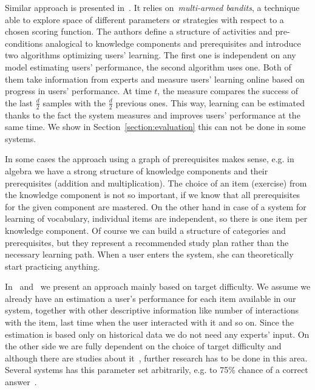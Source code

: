 \documentclass[table,color,cover,twoside,nolot,nolof]{fithesis3/fithesis3}
\begin{document}
Similar approach is presented in~\cite{lopes2015multi}. It relies
on~\emph{multi-armed bandits}, a technique able to explore
space of different parameters or strategies with respect to a chosen scoring
function. The authors define a structure of activities and pre-conditions
analogical to knowledge components and prerequisites and introduce two
algorithms optimizing users' learning. The first one is independent on any
model estimating users' performance, the second algorithm uses one. Both of
them take information from experts and measure users' learning online based on
progress in users' performance. At time $t$, the measure compares the success
of the last $\frac{d}{2}$ samples with the $\frac{d}{2}$ previous ones. This
way, learning can be estimated thanks to the fact the system measures and
improves users' performance at the same time. We show in
Section~\ref{section:evaluation} this can not be done in some systems.

In some cases the approach using a graph of prerequisites makes sense, e.g.
in algebra we have a strong structure of knowledge
components and their prerequisites (addition and multiplication). The choice
of an item (exercise) from the knowledge component is not so important, if we
know that all prerequisites for the given component are mastered. On the other
hand in case of a system for learning of vocabulary, individual items are
independent, so there is one item per knowledge component. Of course we can
build a structure of categories and prerequisites, but they represent a
recommended study plan rather than the necessary learning path. When a user
enters the system, she can theoretically start practicing anything.

In~\cite{papousek2014adaptive} and~\cite{papousek2015impact} we present an
approach mainly based on target difficulty. We assume we already have an
estimation a user's performance for each item available in our system,
together with other descriptive information like number of interactions with
the item, last time when the user interacted with it and so on. Since the
estimation is based only on historical data we do not need any experts' input.
On the other side we are fully dependent on the choice of target difficulty and
although there are studies about it~\cite{lomas2013optimizing,
lomas2014optimizing,jansen2013influence,papousek2015impact}, further research
has to be done in this area. Several systems has this parameter set
arbitrarily, e.g. to 75\% chance of a correct
answer~\cite{klinkenberg2011computer}.
\end{document}

